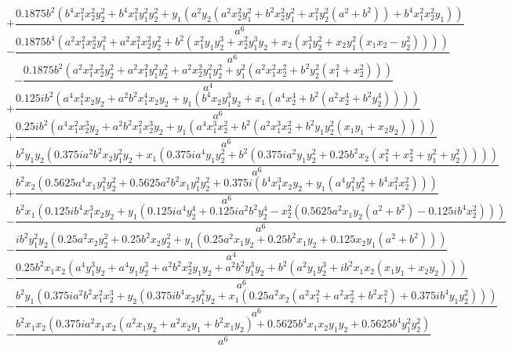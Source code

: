 $$+\frac{0.1875 b^{2} \left(b^{4} x_{1}^{2} x_{2}^{2} y_{2}^{2} + b^{4} x_{1}^{2} y_{1}^{2} y_{2}^{2} + y_{1} \left(a^{2} y_{2} \left(a^{2} x_{2}^{2} y_{1}^{2} + b^{2} x_{2}^{2} y_{1}^{2} + x_{1}^{2} y_{2}^{2} \left(a^{2} + b^{2}\right)\right) + b^{4} x_{1}^{2} x_{2}^{2} y_{1}\right)\right)}{a^{6}}$$
$$- \frac{0.1875 b^{4} \left(a^{2} x_{1}^{2} x_{2}^{2} y_{1}^{2} + a^{2} x_{1}^{2} x_{2}^{2} y_{2}^{2} + b^{2} \left(x_{1}^{2} y_{1} y_{2}^{3} + x_{2}^{2} y_{1}^{3} y_{2} + x_{2} \left(x_{1}^{3} y_{2}^{2} + x_{2} y_{1}^{2} \left(x_{1} x_{2} - y_{2}^{2}\right)\right)\right)\right)}{a^{6}}$$
$$- \frac{0.1875 b^{2} \left(a^{2} x_{1}^{2} x_{2}^{2} y_{2}^{2} + a^{2} x_{1}^{2} y_{1}^{2} y_{2}^{2} + a^{2} x_{2}^{2} y_{1}^{2} y_{2}^{2} + y_{1}^{2} \left(a^{2} x_{1}^{2} x_{2}^{2} + b^{2} y_{2}^{2} \left(x_{1}^{2} + x_{2}^{2}\right)\right)\right)}{a^{4}}$$
$$+\frac{0.125 i b^{2} \left(a^{4} x_{1}^{4} x_{2} y_{2} + a^{2} b^{2} x_{1}^{4} x_{2} y_{2} + y_{1} \left(b^{4} x_{2} y_{1}^{3} y_{2} + x_{1} \left(a^{4} x_{2}^{4} + b^{2} \left(a^{2} x_{2}^{4} + b^{2} y_{2}^{4}\right)\right)\right)\right)}{a^{6}}$$
$$+\frac{0.25 i b^{2} \left(a^{4} x_{1}^{2} x_{2}^{3} y_{2} + a^{2} b^{2} x_{1}^{2} x_{2}^{3} y_{2} + y_{1} \left(a^{4} x_{1}^{3} x_{2}^{2} + b^{2} \left(a^{2} x_{1}^{3} x_{2}^{2} + b^{2} y_{1} y_{2}^{2} \left(x_{1} y_{1} + x_{2} y_{2}\right)\right)\right)\right)}{a^{6}}$$
$$+\frac{b^{2} y_{1} y_{2} \left(0.375 i a^{2} b^{2} x_{2} y_{1}^{2} y_{2} + x_{1} \left(0.375 i a^{4} y_{1} y_{2}^{2} + b^{2} \left(0.375 i a^{2} y_{1} y_{2}^{2} + 0.25 b^{2} x_{2} \left(x_{1}^{2} + x_{2}^{2} + y_{1}^{2} + y_{2}^{2}\right)\right)\right)\right)}{a^{6}}$$
$$+\frac{b^{2} x_{2} \left(0.5625 a^{4} x_{1} y_{1}^{2} y_{2}^{2} + 0.5625 a^{2} b^{2} x_{1} y_{1}^{2} y_{2}^{2} + 0.375 i \left(b^{4} x_{1}^{3} x_{2} y_{2} + y_{1} \left(a^{4} y_{1}^{2} y_{2}^{2} + b^{4} x_{1}^{2} x_{2}^{2}\right)\right)\right)}{a^{6}}$$
$$- \frac{b^{2} x_{1} \left(0.125 i b^{4} x_{1}^{3} x_{2} y_{2} + y_{1} \left(0.125 i a^{4} y_{2}^{4} + 0.125 i a^{2} b^{2} y_{2}^{4} - x_{2}^{2} \left(0.5625 a^{2} x_{1} y_{2} \left(a^{2} + b^{2}\right) - 0.125 i b^{4} x_{2}^{2}\right)\right)\right)}{a^{6}}$$
$$- \frac{i b^{2} y_{1}^{2} y_{2} \left(0.25 a^{2} x_{2} y_{2}^{2} + 0.25 b^{2} x_{2} y_{2}^{2} + y_{1} \left(0.25 a^{2} x_{1} y_{2} + 0.25 b^{2} x_{1} y_{2} + 0.125 x_{2} y_{1} \left(a^{2} + b^{2}\right)\right)\right)}{a^{4}}$$
$$- \frac{0.25 b^{2} x_{1} x_{2} \left(a^{4} y_{1}^{3} y_{2} + a^{4} y_{1} y_{2}^{3} + a^{2} b^{2} x_{2}^{2} y_{1} y_{2} + a^{2} b^{2} y_{1}^{3} y_{2} + b^{2} \left(a^{2} y_{1} y_{2}^{3} + i b^{2} x_{1} x_{2} \left(x_{1} y_{1} + x_{2} y_{2}\right)\right)\right)}{a^{6}}$$
$$- \frac{b^{2} y_{1} \left(0.375 i a^{2} b^{2} x_{1}^{2} x_{2}^{3} + y_{2} \left(0.375 i b^{4} x_{2} y_{1}^{2} y_{2} + x_{1} \left(0.25 a^{2} x_{2} \left(a^{2} x_{1}^{2} + a^{2} x_{2}^{2} + b^{2} x_{1}^{2}\right) + 0.375 i b^{4} y_{1} y_{2}^{2}\right)\right)\right)}{a^{6}}$$
$$- \frac{b^{2} x_{1} x_{2} \left(0.375 i a^{2} x_{1} x_{2} \left(a^{2} x_{1} y_{2} + a^{2} x_{2} y_{1} + b^{2} x_{1} y_{2}\right) + 0.5625 b^{4} x_{1} x_{2} y_{1} y_{2} + 0.5625 b^{4} y_{1}^{2} y_{2}^{2}\right)}{a^{6}}$$

